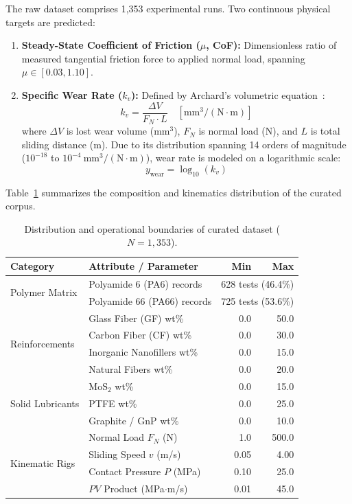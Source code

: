 \documentclass[10pt,twocolumn,a4paper]{article}
\begin{document}
The raw dataset comprises 1,353 experimental runs. Two continuous physical targets are predicted:
\begin{enumerate}
    \item \textbf{Steady-State Coefficient of Friction ($\mu$, CoF):} Dimensionless ratio of measured tangential friction force to applied normal load, spanning $\mu \in [0.03, 1.10]$.
    \item \textbf{Specific Wear Rate ($k_v$):} Defined by Archard's volumetric equation~\cite{archard1953contact}:
    \begin{equation}
        k_v = \frac{\Delta V}{F_N \cdot L} \quad \left[\text{mm}^3/(\text{N}\cdot\text{m})\right]
        \label{eq:wear_rate}
    \end{equation}
    where $\Delta V$ is lost wear volume ($\text{mm}^3$), $F_N$ is normal load (N), and $L$ is total sliding distance (m). Due to its distribution spanning 14 orders of magnitude ($10^{-18}$ to $10^{-4}~\text{mm}^3/(\text{N}\cdot\text{m})$), wear rate is modeled on a logarithmic scale:
    \begin{equation}
        y_{\text{wear}} = \log_{10}(k_v)
        \label{eq:log_wear}
    \end{equation}
\end{enumerate}

Table~\ref{tab:dataset_dist} summarizes the composition and kinematics distribution of the curated corpus.

\begin{table}[t]
\centering
\caption{Distribution and operational boundaries of curated dataset ($N = 1,353$).}
\label{tab:dataset_dist}
\small
\begin{tabular}{llrr}
\toprule
\textbf{Category} & \textbf{Attribute / Parameter} & \textbf{Min} & \textbf{Max} \\
\midrule
\multirow{2}{*}{Polymer Matrix} & Polyamide 6 (PA6) records & \multicolumn{2}{c}{628 tests (46.4\%)} \\
 & Polyamide 66 (PA66) records & \multicolumn{2}{c}{725 tests (53.6\%)} \\
\midrule
\multirow{4}{*}{Reinforcements} & Glass Fiber (GF) wt\% & 0.0 & 50.0 \\
 & Carbon Fiber (CF) wt\% & 0.0 & 30.0 \\
 & Inorganic Nanofillers wt\% & 0.0 & 15.0 \\
 & Natural Fibers wt\% & 0.0 & 20.0 \\
\midrule
\multirow{3}{*}{Solid Lubricants} & $\text{MoS}_2$ wt\% & 0.0 & 15.0 \\
 & PTFE wt\% & 0.0 & 25.0 \\
 & Graphite / GnP wt\% & 0.0 & 10.0 \\
\midrule
\multirow{4}{*}{Kinematic Rigs} & Normal Load $F_N$ (N) & 1.0 & 500.0 \\
 & Sliding Speed $v$ (m/s) & 0.05 & 4.00 \\
 & Contact Pressure $P$ (MPa) & 0.10 & 25.0 \\
 & $PV$ Product (MPa$\cdot$m/s) & 0.01 & 45.0 \\
\bottomrule
\end{tabular}
\end{table}
\end{document}
